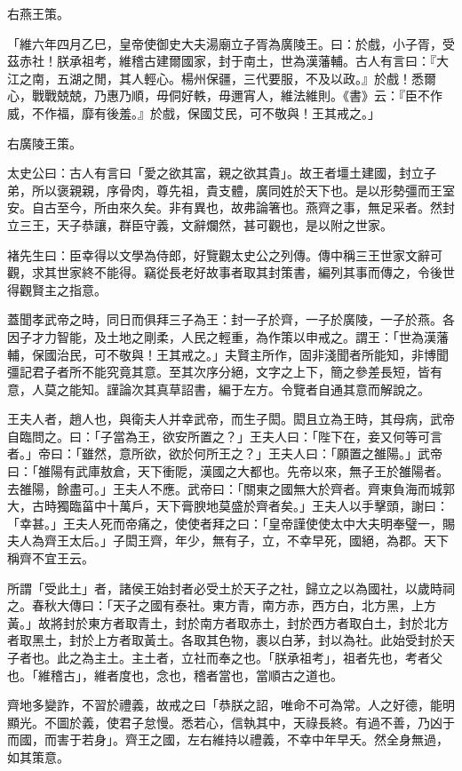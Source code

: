 \begin{pinyinscope}
右燕王策。

「維六年四月乙巳，皇帝使御史大夫湯廟立子胥為廣陵王。曰：於戲，小子胥，受茲赤社！朕承祖考，維稽古建爾國家，封于南土，世為漢藩輔。古人有言曰：『大江之南，五湖之閒，其人輕心。楊州保疆，三代要服，不及以政。』於戲！悉爾心，戰戰兢兢，乃惠乃順，毋侗好軼，毋邇宵人，維法維則。《書》云：『臣不作威，不作福，靡有後羞。』於戲，保國艾民，可不敬與！王其戒之。」

右廣陵王策。

太史公曰：古人有言曰「愛之欲其富，親之欲其貴」。故王者壃土建國，封立子弟，所以褒親親，序骨肉，尊先祖，貴支體，廣同姓於天下也。是以形勢彊而王室安。自古至今，所由來久矣。非有異也，故弗論箸也。燕齊之事，無足采者。然封立三王，天子恭讓，群臣守義，文辭爛然，甚可觀也，是以附之世家。

褚先生曰：臣幸得以文學為侍郎，好覽觀太史公之列傳。傳中稱三王世家文辭可觀，求其世家終不能得。竊從長老好故事者取其封策書，編列其事而傳之，令後世得觀賢主之指意。

蓋聞孝武帝之時，同日而俱拜三子為王：封一子於齊，一子於廣陵，一子於燕。各因子才力智能，及土地之剛柔，人民之輕重，為作策以申戒之。謂王：「世為漢藩輔，保國治民，可不敬與！王其戒之。」夫賢主所作，固非淺聞者所能知，非博聞彊記君子者所不能究竟其意。至其次序分絕，文字之上下，簡之參差長短，皆有意，人莫之能知。謹論次其真草詔書，編于左方。令覽者自通其意而解說之。

王夫人者，趙人也，與衛夫人并幸武帝，而生子閎。閎且立為王時，其母病，武帝自臨問之。曰：「子當為王，欲安所置之？」王夫人曰：「陛下在，妾又何等可言者。」帝曰：「雖然，意所欲，欲於何所王之？」王夫人曰：「願置之雒陽。」武帝曰：「雒陽有武庫敖倉，天下衝阸，漢國之大都也。先帝以來，無子王於雒陽者。去雒陽，餘盡可。」王夫人不應。武帝曰：「關東之國無大於齊者。齊東負海而城郭大，古時獨臨菑中十萬戶，天下膏腴地莫盛於齊者矣。」王夫人以手擊頭，謝曰：「幸甚。」王夫人死而帝痛之，使使者拜之曰：「皇帝謹使使太中大夫明奉璧一，賜夫人為齊王太后。」子閎王齊，年少，無有子，立，不幸早死，國絕，為郡。天下稱齊不宜王云。

所謂「受此土」者，諸侯王始封者必受土於天子之社，歸立之以為國社，以歲時祠之。春秋大傳曰：「天子之國有泰社。東方青，南方赤，西方白，北方黑，上方黃。」故將封於東方者取青土，封於南方者取赤土，封於西方者取白土，封於北方者取黑土，封於上方者取黃土。各取其色物，裹以白茅，封以為社。此始受封於天子者也。此之為主土。主土者，立社而奉之也。「朕承祖考」，祖者先也，考者父也。「維稽古」，維者度也，念也，稽者當也，當順古之道也。

齊地多變詐，不習於禮義，故戒之曰「恭朕之詔，唯命不可為常。人之好德，能明顯光。不圖於義，使君子怠慢。悉若心，信執其中，天祿長終。有過不善，乃凶于而國，而害于若身」。齊王之國，左右維持以禮義，不幸中年早夭。然全身無過，如其策意。


\end{pinyinscope}
